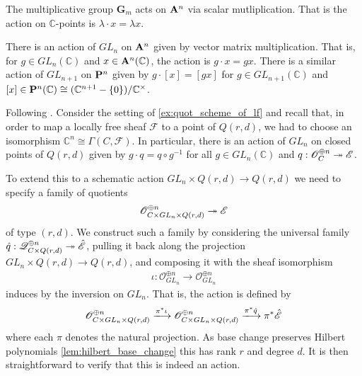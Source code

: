 \documentclass[12pt]{ociamthesis}  %
\begin{document}
\begin{example}
  The multiplicative group $\mathbf G_m$ acts on $\mathbf{A}^{n}_{}$
  via scalar mutliplication. That is the action on $\mathbb C$-points
  is $\lambda\cdot x = \lambda x$.
\end{example}

\begin{example}
  There is an action of $GL_n$ on $\mathbf{A}^{n}_{}$ given by vector
  matrix multiplication. That is, for $g\in GL_n(\mathbb C)$
  and $x\in\mathbf{A}^{n}_{}(\mathbb C)$, the action is $g\cdot x = gx$.
  There is a similar action of $GL_{n+1}$ on $\mathbf{P}^{n}_{}$
  given by $g\cdot[x] = [gx]$ for $g\in GL_{n+1}(\mathbb C)$
  and $[x]\in\mathbf{P}^{n}_{}(\mathbb C) \cong (\mathbb C^{n+1} - \{0\})/\mathbb C^\times$.
\end{example}

\begin{example}\label{ex:lf_action}
  Following \cite[Lemma 8.49]{hoskins2016}.
  Consider the setting of \ref{ex:quot_scheme_of_lf} and recall
  that, in order to map a locally free sheaf $\mathscr F$ to a point of
  $Q(r,d)$, we had to choose an isomorphism
  $\mathbb C^n \cong \Gamma(C,\mathscr F)$. In particular, there
  is an action of $GL_n$ on closed points of $Q(r,d)$
  given by $g\cdot q = q\circ g^{-1}$ for all $g\in GL_n(\mathbb C)$
  and $q : \mathscr O^{\oplus n}_C \twoheadrightarrow \mathscr E$.

  To extend this to a schematic action $GL_n \times Q(r,d) \to Q(r,d)$
  we need to specify a family of quotients
  \begin{align*}
    \mathscr O^{\oplus n}_{C\times GL_n\times Q(r,d)}\twoheadrightarrow \mathscr E
  \end{align*}
  of type $(r,d)$. We construct such a family by
  considering the universal family $\hat q:\mathscr Q^{\oplus n}_{C\times Q(r,d)}\twoheadrightarrow \hat{\mathscr E}$,
  pulling it back along the projection $GL_n\times Q(r,d)\to Q(r,d)$,
  and composing it with the sheaf isomorphism
  \begin{align*}
    \iota : \mathscr O^{\oplus n}_{GL_n} \to \mathscr O^{\oplus n}_{GL_n}
  \end{align*}
  induces by the inversion on $GL_n$. That is, the action is defined
  by
  \begin{align*}
    \mathscr O^{\oplus n}_{C\times GL_n\times Q(r,d)}
    \xlongrightarrow{\pi^*\iota}
    \mathscr O^{\oplus n}_{C\times GL_n\times Q(r,d)}
    \xlongrightarrow{\pi^*\hat q}
    \pi^*\hat{\mathscr E}
  \end{align*}
  where each $\pi$ denotes the natural projection. As base change
  preserves Hilbert polynomials \ref{lem:hilbert_base_change} this
  has rank $r$ and degree $d$. It is then straightforward to verify
  that this is indeed an action.
\end{example}
\end{document}
